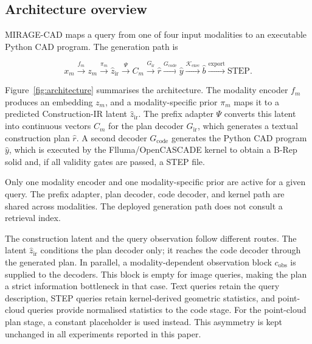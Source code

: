 \documentclass[preprint,12pt]{elsarticle}
\begin{document}
\subsection{Architecture overview}
\label{sec:arch_overview}

MIRAGE-CAD maps a query from one of four input modalities to an executable
Python CAD program. The generation path is

\begin{equation}
  x_m
  \xrightarrow{f_m}
  z_m
  \xrightarrow{\pi_m}
  \hat{z}_{\mathrm{ir}}
  \xrightarrow{\Psi}
  C_m
  \xrightarrow{G_{\mathrm{ir}}}
  \hat{r}
  \xrightarrow{G_{\mathrm{code}}}
  \hat{y}
  \xrightarrow{\mathcal{K}_{\mathrm{exec}}}
  \hat{b}
  \xrightarrow{\mathrm{export}}
  \mathrm{STEP}.
\end{equation}

Figure~\ref{fig:architecture} summarises the architecture. The modality
encoder $f_m$ produces an embedding $z_m$, and a modality-specific prior
$\pi_m$ maps it to a predicted Construction-IR latent
$\hat{z}_{\mathrm{ir}}$. The prefix adapter $\Psi$ converts this latent into
continuous vectors $C_m$ for the plan decoder $G_{\mathrm{ir}}$, which
generates a textual construction plan $\hat{r}$. A second decoder
$G_{\mathrm{code}}$ generates the Python CAD program $\hat{y}$, which is
executed by the Flluma/OpenCASCADE kernel to obtain a B-Rep solid and, if all
validity gates are passed, a STEP file.

Only one modality encoder and one modality-specific prior are active for a
given query. The prefix adapter, plan decoder, code decoder, and kernel path are
shared across modalities. The deployed generation path does not consult a
retrieval index.

The construction latent and the query observation follow different routes.
The latent $\hat{z}_{\mathrm{ir}}$ conditions the plan decoder only; it reaches
the code decoder through the generated plan. In parallel, a
modality-dependent observation block $c_{\mathrm{obs}}$ is supplied to the
decoders. This block is empty for image queries, making the plan a strict
information bottleneck in that case. Text queries retain the query
description, STEP queries retain kernel-derived geometric statistics, and
point-cloud queries provide normalised statistics to the code stage. For the
point-cloud plan stage, a constant placeholder is used instead. This
asymmetry is kept unchanged in all experiments reported in this paper.
\end{document}
